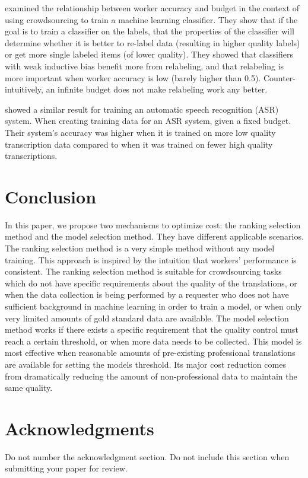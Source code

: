 \documentclass[11pt]{article}
\begin{document}
 examined the relationship between worker accuracy and budget in the context of using crowdsourcing to train a machine learning classifier.  They show that if the goal is to train a classifier on the labels, that the properties of the classifier will determine whether it is better to re-label data (resulting in higher quality labels) or get more single labeled items (of lower quality). They showed that classifiers with weak inductive bias  benefit more from relabeling, and that relabeling is more important when worker accuracy is low (barely higher than 0.5). 
Counter-intuitively, an infinite budget does not make relabeling work any better.

 showed a similar result for training an automatic speech recognition (ASR) system.  When creating training data for an ASR system, given a fixed budget. Their system's accuracy was higher when it is trained on more low quality transcription data compared to when it was trained on fewer high quality transcriptions.


\section{Conclusion}
In this paper, we propose two mechanisms to optimize cost: the ranking selection method and the model selection method. They have  different applicable scenarios. The ranking selection method is a very simple method without any model training. This approach is inspired by the intuition that workers' performance is consistent. The ranking selection method is suitable for crowdsourcing tasks which do not have specific requirements about the quality of the translations, or when the data collection is being performed by a requester who does not have sufficient background in machine learning in order to train a model, or when only very limited amounts of gold standard data are available.
The model selection method works if there exists a specific requirement that the quality control must reach a certain threshold, or when more data needs to be collected.  This model is most effective when reasonable amounts of pre-existing professional translations are available for setting the models threshold.  Its major cost reduction comes from dramatically reducing the amount of non-professional data to maintain the same quality.
\section*{Acknowledgments}

Do not number the acknowledgment section. Do not include this section when submitting your paper for review.



\end{document}

